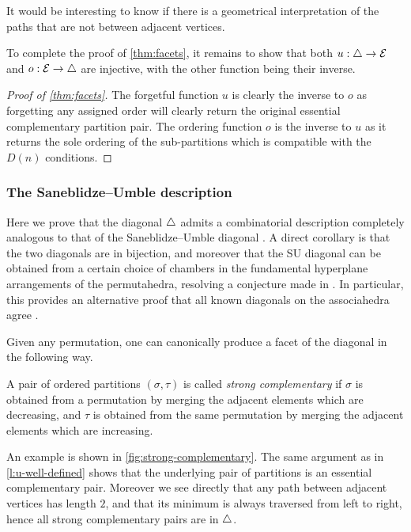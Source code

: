 \begin{rem}
    It would be interesting to know if there is a geometrical interpretation of the paths that are not between adjacent vertices. 
\end{rem}

To complete the proof of \cref{thm:facets}, it remains to show that both $u:\triangle \to \mathcal{E}$ and $o:\mathcal{E}\to \triangle$ are injective, with the other function being their inverse.

\begin{proof}[{Proof of \cref{thm:facets}}]
The forgetful function $u$ is clearly the inverse to $o$ as forgetting any assigned order will clearly return the original essential complementary partition pair. 
The ordering function $o$ is the inverse to $u$ as it returns the sole ordering of the sub-partitions which is compatible with the $D(n)$ conditions.
\end{proof}


\subsubsection{The Saneblidze--Umble description}

Here we prove that the diagonal $\triangle$ admits a combinatorial description completely analogous to that of the Saneblidze--Umble diagonal \cite{SaneblidzeUmble04}. 
A direct corollary is that the two diagonals are in bijection, and moreover that the SU diagonal can be obtained from a certain choice of chambers in the fundamental hyperplane arrangements of the permutahedra, resolving a conjecture made in \cite{LA21}.
In particular, this provides an alternative proof that all known diagonals on the associahedra agree \cite{saneblidzeComparingDiagonalsAssociahedra2022}.

Given any permutation, one can canonically produce a facet of the diagonal in the following way. 

\begin{definition}
    A pair of ordered partitions $(\sigma,\tau)$ is called \emph{strong complementary} if $\sigma$ is obtained from a permutation by merging the adjacent elements which are decreasing, and $\tau$ is obtained from the same permutation by merging the adjacent elements which are increasing.
\end{definition}

An example is shown in \cref{fig:strong-complementary}.
The same argument as in \cref{l:u-well-defined} shows that the underlying pair of partitions is an essential complementary pair. 
Moreover we see directly that any path between adjacent vertices has length $2$, and that its minimum is always traversed from left to right, hence all strong complementary pairs are in $\triangle$. 

